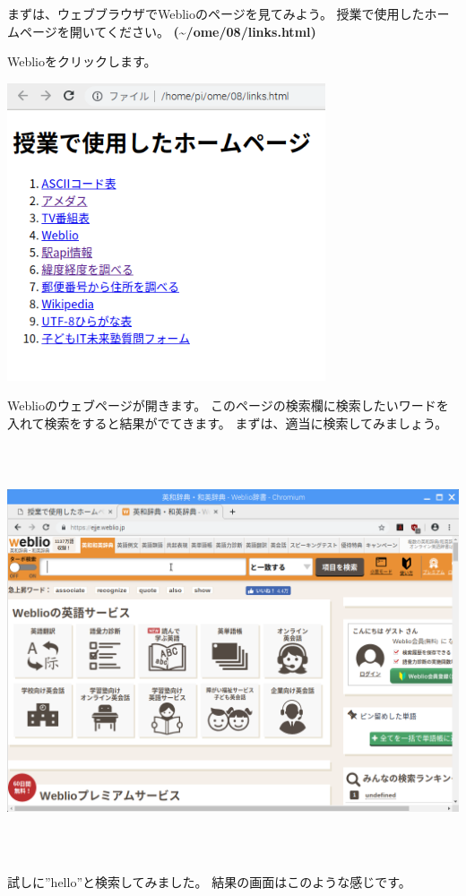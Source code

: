 \documentclass[a4paper,12pt,dvipdfmx]{jarticle}
\begin{document}
まずは、ウェブブラウザでWeblioのページを見てみよう。
授業で使用したホームページを開いてください。
\textbf{(\~{}/ome/08/links.html)}

Weblioをクリックします。 



\begin{center}
\includegraphics[width=9.398cm,height=8.784cm]{textbook-img017.png}

\end{center}


\bigskip


\bigskip

Weblioのウェブページが開きます。
このページの検索欄に検索したいワードを入れて検索をすると結果がでてきます。
まずは、適当に検索してみましょう。



\begin{center}
\includegraphics[width=17.006cm,height=12.157cm]{textbook-img045.png}

\end{center}
\clearpage
試しに”hello”と検索してみました。
結果の画面はこのような感じです。
\end{document}

